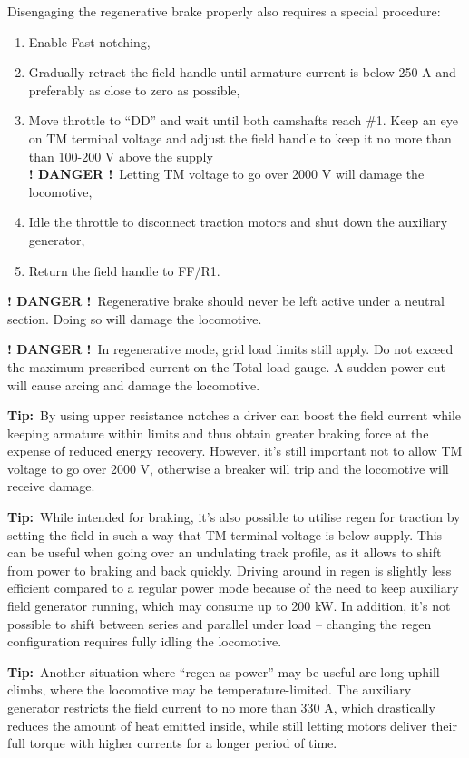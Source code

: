 \documentclass[11pt, a4paper]{article}
\newcommand{\danger}{\textbf{\color{red} ! DANGER !}}
\newcommand{\Tip}{\textbf{Tip:}}
\begin{document}
Disengaging the regenerative brake properly also requires a special procedure:
\begin{enumerate}
\item Enable Fast notching,
\item Gradually retract the field handle until armature current is below 250 A and preferably as close to zero as possible,
\item Move throttle to ``DD'' and wait until both camshafts reach \#1. Keep an eye on TM terminal voltage and adjust the field handle to keep it no more than than 100-200 V above the supply\\
\danger\ Letting TM voltage to go over 2000 V will damage the locomotive,
\item Idle the throttle to disconnect traction motors and shut down the auxiliary generator,
\item Return the field handle to FF/R1.
\end{enumerate}

\danger\ Regenerative brake should never be left active under a neutral section. Doing so will damage the locomotive.

\danger\ In regenerative mode, grid load limits still apply. Do not exceed the maximum prescribed current on the Total load gauge. A sudden power cut will cause arcing and damage the locomotive.

\Tip\ By using upper resistance notches a driver can boost the field current while keeping armature within limits and thus obtain greater braking force at the expense of reduced energy recovery. However, it's still important not to allow TM voltage to go over 2000 V, otherwise a breaker will trip and the locomotive will receive damage.

\Tip\ While intended for braking, it's also possible to utilise regen for traction by setting the field in such a way that TM terminal voltage is below supply. This can be useful when going over an undulating track profile, as it allows to shift from power to braking and back quickly. Driving around in regen is slightly less efficient compared to a regular power mode because of the need to keep auxiliary field generator running, which may consume up to 200 kW. In addition, it's not possible to shift between series and parallel under load -- changing the regen configuration requires fully idling the locomotive.

\Tip\ Another situation where ``regen-as-power'' may be useful are long uphill climbs, where the locomotive may be temperature-limited. The auxiliary generator restricts the field current to no more than 330 A, which drastically reduces the amount of heat emitted inside, while still letting motors deliver their full torque with higher currents for a longer period of time.
\end{document}
